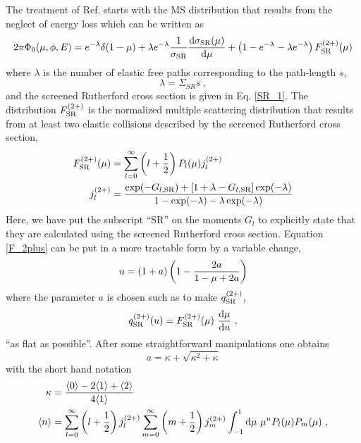 The treatment of Ref. \cite{KB97} starts with the MS distribution 
that results from the neglect of energy loss which can be written 
as 
\begin{equation}
2 \pi \Phi_0(\mu,\phi,E) = e^{-\lambda} \delta(1 - \mu) 
+ \lambda e^{-\lambda} {1 \over \sigma_{\rm SR}} 
{{\rm d} \sigma_{\rm SR}(\mu) \over {\rm d}\mu} + 
\left(1 - e^{-\lambda} - \lambda e^{-\lambda} \right) F^{(2+)}_{\rm SR} (\mu)
\end{equation}
where $\lambda$ is the number of elastic free paths corresponding 
to the path-length $s$,
\begin{equation}
\label{lambda}
\lambda = \Sigma_{SR} s~,
\end{equation}
and the screened Rutherford cross section
is given in Eq. \eqref{SR_1}. 
The distribution $F^{(2+)}_{\rm SR}$ is the normalized multiple 
scattering distribution 
that results from at least two elastic collisions described by 
the screened Rutherford cross section, 
\begin{equation}
\label{F_2plus}
\begin{split}
F^{(2+)}_{\rm SR}(\mu) & = \sum_{l=0}^\infty \left(l + \frac{1}{2} \right) 
P_l(\mu) j_l^{(2+)}  \\
j_l^{(2+)} & = { \exp(-G_{l, {\rm SR}}) + 
\left[ 1 + \lambda - G_{l,{\rm SR}} \right] \exp(-\lambda) 
\over 1 - \exp(-\lambda) - \lambda \exp(-\lambda) }
\end{split}
\end{equation}
Here, we have put the subscript ``SR'' on the moments $G_l$ 
to explicitly state that they are calculated 
using the screened Rutherford cross section. 
Equation \eqref{F_2plus} can be put in a more tractable form 
by a variable change,
\begin{equation}
u = (1 + a) \left(1 - {2 a \over 1 - \mu + 2 a} \right)
\end{equation}
where the parameter $a$ is chosen such as to make $q^{(2+)}_{\rm SR}$, 
\begin{equation}
q^{(2+)}_{\rm SR}(u) = F^{(2+)}_{\rm SR}(\mu)~{{\rm d} \mu \over {\rm d} u}~,
\end{equation}
``as flat as possible''. After some 
straightforward manipulations one obtains \cite{KB97}
\begin{equation}
\label{a-kappa}
a = \kappa + \sqrt{\kappa^2 + \kappa}
\end{equation} 
with the short hand notation
\begin{equation}
\label{kappa}
\begin{split}
\kappa & = {\langle 0\rangle - 2 \langle 1\rangle +  
          \langle 2\rangle \over 4 \langle 1\rangle } \\
\langle n\rangle & = 
\sum_{l=0}^\infty \left( l + {1 \over 2} \right) j_l^{(2+)}
      \sum_{m=0}^\infty \left( m + {1 \over 2} \right) j_m^{(2+)}
      \int_{-1}^1 {\rm d} \mu~ \mu^n P_l(\mu) P_m(\mu)~,
\end{split}
\end{equation}
